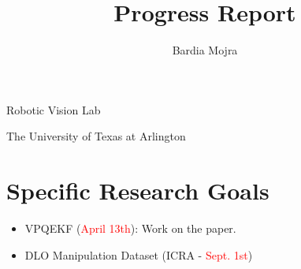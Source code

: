 \documentclass[11pt]{article}
\title{Progress Report}
\author{Bardia Mojra}
\begin{document}
\maketitle
\thispagestyle{empty}

\bigskip
\bigskip
\begin{center}
 Robotic Vision Lab
\end{center}

\begin{center}
The University of Texas at Arlington
\end{center}

\newpage

\section{Specific Research Goals}
\begin{itemize}
      \item VPQEKF (\textcolor{red}{April 13th}): Work on the paper.
      \item DLO Manipulation Dataset (ICRA - \textcolor{red}{Sept. 1st})
\end{itemize}
\end{document}
